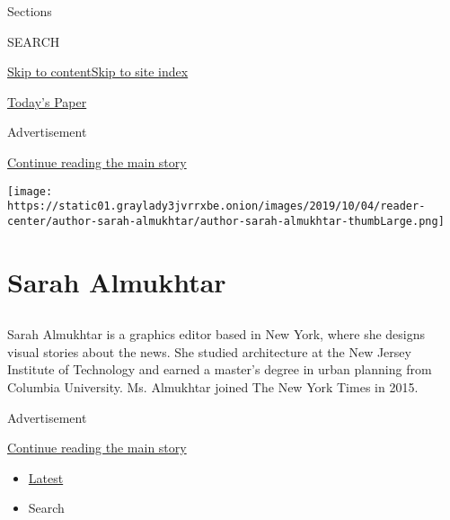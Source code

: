 Sections

SEARCH

\protect\hyperlink{site-content}{Skip to
content}\protect\hyperlink{site-index}{Skip to site index}

\href{https://myaccount.nytimes3xbfgragh.onion/auth/login?response_type=cookie\&client_id=vi}{}

\href{https://www.nytimes3xbfgragh.onion/section/todayspaper}{Today's
Paper}

Advertisement

\protect\hyperlink{after-top}{Continue reading the main story}

\texttt{[image: https://static01.graylady3jvrrxbe.onion/images/2019/10/04/reader-center/author-sarah-almukhtar/author-sarah-almukhtar-thumbLarge.png]}

\hypertarget{sarah-almukhtar}{%
\section{Sarah Almukhtar}\label{sarah-almukhtar}}

\subsection{}

Sarah Almukhtar is a graphics editor based in New York, where she
designs visual stories about the news. She studied architecture at the
New Jersey Institute of Technology and earned a master's degree in urban
planning from Columbia University. Ms. Almukhtar joined The New York
Times in 2015.

Advertisement

\protect\hyperlink{after-mid1}{Continue reading the main story}

\begin{itemize}
\tightlist
\item
  \protect\hyperlink{stream-panel}{Latest}
\item
  Search
\end{itemize}

